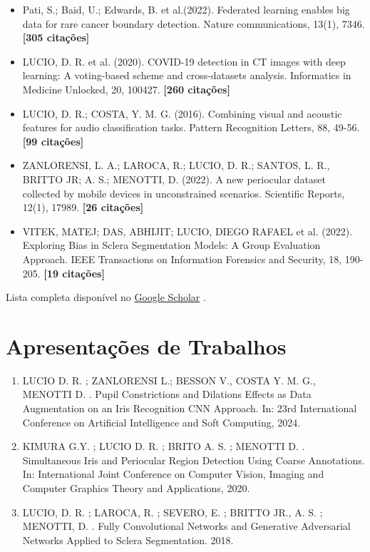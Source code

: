 \documentclass[12pt,a4paper,sans]{moderncv}
\begin{document}
\begin{itemize}

\item Pati, S.; Baid, U.; Edwards, B. et al.(2022). Federated learning enables big data for rare cancer boundary detection. Nature communications, 13(1), 7346. \textbf{[305 citações]}

\item LUCIO, D. R. et al. (2020). COVID-19 detection in CT images with deep learning: A voting-based scheme and cross-datasets analysis. Informatics in Medicine Unlocked, 20, 100427. \textbf{[260 citações]}

\item LUCIO, D. R.; COSTA, Y. M. G. (2016). Combining visual and acoustic features for audio classification tasks. Pattern Recognition Letters, 88, 49-56. \textbf{[99 citações]}

\item ZANLORENSI, L. A.; LAROCA, R.; LUCIO, D. R.; SANTOS, L. R., BRITTO JR; A. S.; MENOTTI, D. (2022). A new periocular dataset collected by mobile devices in unconstrained scenarios. Scientific Reports, 12(1), 17989. \textbf{[26 citações]}

\item VITEK, MATEJ; DAS, ABHIJIT; LUCIO, DIEGO RAFAEL et al. (2022). Exploring Bias in Sclera Segmentation Models: A Group Evaluation Approach. IEEE Transactions on Information Forensics and Security, 18, 190-205. \textbf{[19 citações]}

\end{itemize}

\vspace{8pt}
Lista completa disponível no \href{https://scholar.google.com.br/citations?user=FS_momQAAAAJ&hl=en}{Google Scholar} .

\vspace{12pt}
\section{Apresentações de Trabalhos}

\begin{enumerate}
    \item LUCIO D. R. ; ZANLORENSI L.; BESSON V., COSTA Y. M. G., MENOTTI D. . Pupil Constrictions and Dilations Effects as Data Augmentation on an Iris Recognition CNN Approach. In: 23rd International Conference on Artificial Intelligence and Soft Computing, 2024.

    \item KIMURA G.Y. ; LUCIO D. R. ; BRITO A. S. ; MENOTTI D. . Simultaneous Iris and Periocular Region Detection Using Coarse Annotations. In: International Joint Conference on Computer Vision, Imaging and Computer Graphics Theory and Applications, 2020.

    \item LUCIO, D. R. ; LAROCA, R. ; SEVERO, E. ; BRITTO JR., A. S. ; MENOTTI, D. . Fully Convolutional Networks and Generative Adversarial Networks Applied to Sclera Segmentation. 2018.

\end{enumerate}
\end{document}
